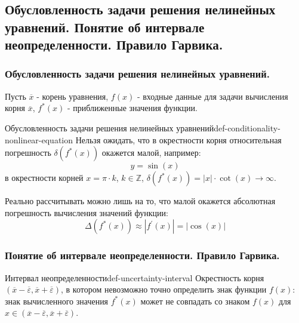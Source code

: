 \documentclass[14pt]{extarticle}
\begin{document}
\subsection{Обусловленность задачи решения нелинейных уравнений. Понятие об интервале неопределенности. Правило Гарвика.}

    \subsubsection{Обусловленность задачи решения нелинейных уравнений.}

        Пусть $\overline{x}$ - корень уравнения, $f(x)$ - входные данные для задачи вычисления корня $\overline{x}$, $f^{*}(x)$ - приближенные значения функции.
    
        \begin{definition}{Обусловленность задачи решения нелинейных уравнений}{def-conditionality-nonlinear-equation}
            Нельзя ожидать, что в окрестности корня относительная погрешность $\delta(f^{*}(x))$ окажется малой, например:\\ 
            $$y = \sin(x)$$ 
            в окрестности корней $x = \pi \cdot k$, $k \in \mathbb{Z}$, $\delta(f^{*}(x)) = |x| \cdot \cot(x) \to \infty$. 
        
            \vspace{\baselineskip}
        
            Реально рассчитывать можно лишь на то, что малой окажется абсолютная погрешность вычисления значений функции:
            $$\Delta(f^{*}(x)) \approx |f^{'}(x)| = |\cos(x)|$$
        \end{definition}

    \subsubsection{Понятие об интервале неопределенности. Правило Гарвика.}

        \begin{definition}{Интервал неопределенности}{def-uncertainty-interval}
            Окрестность корня $(\overline{x} - \overline{\varepsilon}, \overline{x} + \overline{\varepsilon})$, в котором невозможно точно определить знак функции $f(x)$: знак вычисленного значения $f^{*}(x)$ может не совпадать со знаком $f(x)$ для $x \in (\overline{x} - \overline{\varepsilon}, \overline{x} + \overline{\varepsilon})$.
        \end{definition}
\end{document}

